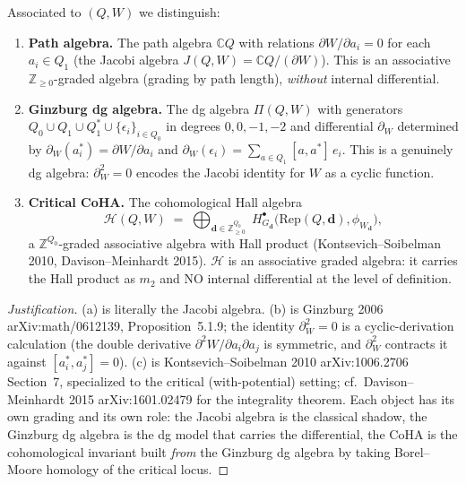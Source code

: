 \begin{definition}
\label{def:three-coha-objects}
Associated to $(Q, W)$ we distinguish:
\begin{enumerate}[label=\textup{(\alph*)}]
 \item \textbf{Path algebra.} The path algebra $\mathbb{C}Q$ with
 relations $\partial W / \partial a_i = 0$ for each $a_i \in Q_1$
 (the Jacobi algebra
 $J(Q, W) = \mathbb{C}Q / (\partial W)$).
 This is an associative $\mathbb{Z}_{\geq 0}$-graded algebra
 (grading by path length), \emph{without} internal differential.
 \item \textbf{Ginzburg dg algebra.} The dg algebra $\Pi(Q, W)$
 with generators $Q_0 \cup Q_1 \cup Q_1^* \cup \{\epsilon_i\}_{i \in Q_0}$
 in degrees $0, 0, -1, -2$ and differential $\partial_W$
 determined by
 $\partial_W(a_i^*) = \partial W / \partial a_i$ and
 $\partial_W(\epsilon_i) = \sum_{a \in Q_1} [a, a^*]\, e_i$.
 This is a genuinely dg algebra: $\partial_W^2 = 0$ encodes the
 Jacobi identity for $W$ as a cyclic function.
 \item \textbf{Critical CoHA.} The cohomological Hall algebra
 \[
 \mathcal{H}(Q, W)
 \;=\;
 \bigoplus_{\mathbf{d} \in \mathbb{Z}_{\geq 0}^{Q_0}}
 \; H^{\bullet}_{G_\mathbf{d}}
 \bigl( \mathrm{Rep}(Q, \mathbf{d}),
 \phi_{W_\mathbf{d}} \bigr),
 \]
 a $\mathbb{Z}^{Q_0}$-graded associative algebra with Hall product
 (Kontsevich--Soibelman 2010, Davison--Meinhardt 2015). $\mathcal{H}$
 is an associative graded algebra: it carries the Hall product as
 $m_2$ and NO internal differential at the level of definition.
\end{enumerate}
\end{definition}

\begin{proof}[Justification]
(a) is literally the Jacobi algebra. (b) is Ginzburg 2006
\textup{arXiv:math/0612139}, Proposition~5.1.9; the identity
$\partial_W^2 = 0$ is a cyclic-derivation calculation (the double
derivative $\partial^2 W / \partial a_i \partial a_j$ is symmetric,
and $\partial_W^2$ contracts it against $[a_i^*, a_j^*] = 0$). (c)
is Kontsevich--Soibelman 2010 \textup{arXiv:1006.2706} Section~7,
specialized to the critical (with-potential) setting; cf.\
Davison--Meinhardt 2015 \textup{arXiv:1601.02479} for the
integrality theorem. Each object has its own grading and its own
role: the Jacobi algebra is the classical shadow, the Ginzburg dg
algebra is the dg model that carries the differential, the CoHA is
the cohomological invariant built \emph{from} the Ginzburg dg algebra
by taking Borel--Moore homology of the critical locus.
\end{proof}

